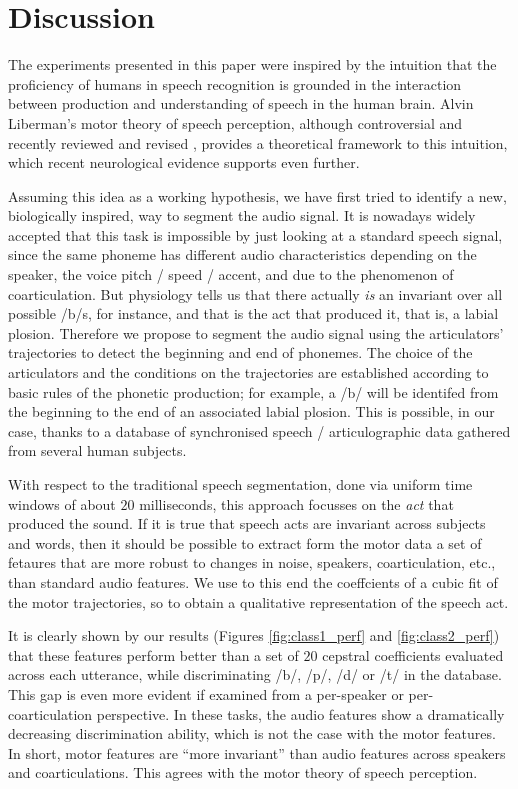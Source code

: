 \section{Discussion}
\label{sec:disc}

The experiments presented in this paper were inspired by the intuition that the
proficiency of humans in speech recognition is grounded in the interaction
between production and understanding of speech in the human brain. Alvin
Liberman's motor theory of speech perception, although controversial and
recently reviewed and revised \cite{liberman1,liberman2,galant,massaro},
provides a theoretical framework to this intuition, which recent neurological
evidence \cite{dausilio} supports even further.

Assuming this idea as a working hypothesis, we have first tried to identify
a new, biologically inspired, way to segment the audio signal. It is nowadays
widely accepted that this task is impossible by just looking at a standard
speech signal, since the same phoneme has different audio characteristics
depending on the speaker, the voice pitch / speed / accent, and due to the
phenomenon of coarticulation. But physiology tells us that there actually \emph{is} an invariant
over all possible /b/s, for instance, and that is the act that produced it,
that is, a labial plosion. Therefore we propose to segment the audio signal
using the articulators' trajectories to detect
the beginning and end of phonemes. The choice of the articulators and the
conditions on the trajectories are established according to basic rules of
the phonetic production; for example, a /b/ will be identifed from
the beginning to the end of an associated labial plosion. This is possible,
in our case, thanks to a database of synchronised speech / articulographic
data gathered from several human subjects.

With respect to the traditional speech segmentation, done via uniform time
windows of about $20$ milliseconds, this approach focusses on the \emph{act}
that produced the sound. If it is true that speech acts are invariant across
subjects and words, then it should be possible to extract form the motor data
a set of fetaures that are more robust to changes in noise, speakers,
coarticulation, etc., than standard
audio features. We use to this end the coeffcients of a cubic fit of the
motor trajectories, so to obtain a qualitative representation of the speech
act.

It is clearly shown by our results (Figures \ref{fig:class1_perf}
and \ref{fig:class2_perf}) that these features perform
better than a set of $20$ cepstral coefficients evaluated across each utterance,
while discriminating /b/, /p/, /d/ or /t/ in the database. This gap is even
more evident if examined from a per-speaker or per-coarticulation perspective.
In these tasks, the audio features show a dramatically decreasing discrimination
ability, which is not the case with the motor features. In short, motor features
are ``more invariant'' than audio features across speakers and coarticulations.
This agrees with the motor theory of speech perception.

